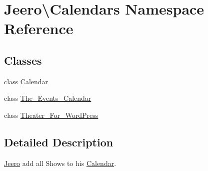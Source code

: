 \hypertarget{namespaceJeero_1_1Calendars}{}\section{Jeero\textbackslash{}Calendars Namespace Reference}
\label{namespaceJeero_1_1Calendars}
\subsection*{Classes}
\begin{DoxyCompactItemize}
\item 
class \hyperlink{classJeero_1_1Calendars_1_1Calendar}{Calendar}
\item 
class \hyperlink{classJeero_1_1Calendars_1_1The__Events__Calendar}{The\+\_\+\+Events\+\_\+\+Calendar}
\item 
class \hyperlink{classJeero_1_1Calendars_1_1Theater__For__WordPress}{Theater\+\_\+\+For\+\_\+\+Word\+Press}
\end{DoxyCompactItemize}


\subsection{Detailed Description}
\hyperlink{namespaceJeero}{Jeero} add all Shows to his \hyperlink{classJeero_1_1Calendars_1_1Calendar}{Calendar}. 